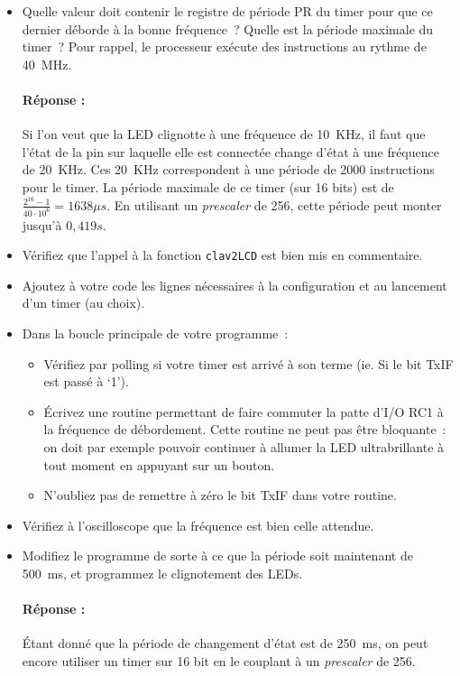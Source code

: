 \documentclass[11pt,a4paper]{article}
\theoremstyle{definition}%
\newcommand{\reponse}[1]{%
	\ifthenelse {\boolean{corrige}} {\paragraph{Réponse :} \color{darkblue}   #1\color{black}} {}
 }
\begin{document}
\begin{itemize}
	\item Quelle valeur doit contenir le registre de période PR du timer pour que ce dernier déborde à la bonne fréquence~?
	Quelle est la période maximale du timer~? Pour rappel, le processeur exécute des instructions au rythme de 40~MHz.
	\reponse{
		Si l'on veut que la LED clignotte à une fréquence de 10~KHz, il faut que l'état de la pin sur laquelle elle est connectée change d'état à une fréquence de 20~KHz.
		Ces 20~KHz correspondent à une période de 2000 instructions pour le timer.
		La période maximale de ce timer (sur 16 bits) est de $\frac{2^{16}-1}{40\cdot10^6} = 1638 \mu s$.
		En utilisant un \textit{prescaler} de 256, cette période peut monter jusqu'à $0,419 s$.
	}
	\item Vérifiez que l’appel à la fonction \texttt{clav2LCD} est bien mis en commentaire.
	\item Ajoutez à votre code les lignes nécessaires à la configuration et au lancement d’un timer (au choix).
	\item Dans la boucle principale de votre programme~:
	\begin{itemize}
		\item Vérifiez par polling si votre timer est arrivé à son terme (ie. Si le bit TxIF est passé à ‘1’).
		\item Écrivez une routine permettant de faire commuter la patte d’I/O RC1 à la fréquence de débordement.
		Cette routine ne peut pas être bloquante~: on doit par exemple pouvoir continuer à allumer la LED ultrabrillante à tout moment en appuyant sur un bouton.
		\item N’oubliez pas de remettre à zéro le bit TxIF dans votre routine.
	\end{itemize}
	\item Vérifiez à l’oscilloscope que la fréquence est bien celle attendue.
	\item Modifiez le programme de sorte à ce que la période soit maintenant de 500~ms, et programmez le clignotement des LEDs.
	\reponse{
		Étant donné que la période de changement d'état est de 250~ms, on peut encore utiliser un timer sur 16 bit en le couplant à un \textit{prescaler} de 256.
	}
\end{itemize}
\end{document}
